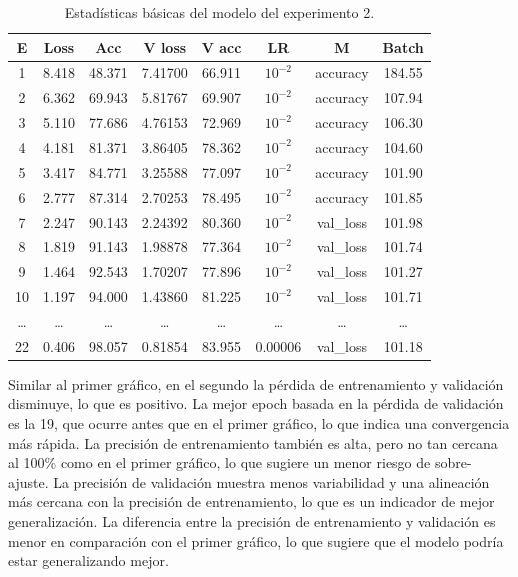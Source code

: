 \begin{table}[H]
    \small
    \begin{center}
        \begin{tabular}{|c|c|c|c|c|c|c|c|} \hline
        E & Loss & Acc & V loss & V acc & LR & M & Batch \\ \hline
        1 & 8.418 & 48.371 & 7.41700 & 66.911 & $10^{-2}$ & accuracy & 184.55 \\ \hline
        2 & 6.362 & 69.943 & 5.81767 & 69.907 & $10^{-2}$ & accuracy & 107.94 \\ \hline
        3 & 5.110 & 77.686 & 4.76153 & 72.969 & $10^{-2}$ & accuracy & 106.30 \\ \hline
        4 & 4.181 & 81.371 & 3.86405 & 78.362 & $10^{-2}$ & accuracy & 104.60 \\ \hline
        5 & 3.417 & 84.771 & 3.25588 & 77.097 & $10^{-2}$ & accuracy & 101.90 \\ \hline
        6 & 2.777 & 87.314 & 2.70253 & 78.495 & $10^{-2}$ & accuracy & 101.85 \\ \hline
        7 & 2.247 & 90.143 & 2.24392 & 80.360 & $10^{-2}$ & val\_loss & 101.98 \\ \hline
        8 & 1.819 & 91.143 & 1.98878 & 77.364 & $10^{-2}$ & val\_loss & 101.74 \\ \hline
        9 & 1.464 & 92.543 & 1.70207 & 77.896 & $10^{-2}$ & val\_loss & 101.27 \\ \hline
        10 & 1.197 & 94.000 & 1.43860 & 81.225 & $10^{-2}$ & val\_loss & 101.71 \\ \hline
        \dots & \dots & \dots & \dots & \dots & \dots & \dots & \dots \\ \hline
        22 & 0.406 & 98.057 & 0.81854 & 83.955 & 0.00006 & val\_loss & 101.18 \\ \hline
        \end{tabular}
        \caption{Estadísticas básicas del modelo del experimento 2.}
    \end{center}\label{fig:estadisticas_p2}
\end{table}

Similar al primer gráfico, en el segundo la pérdida de entrenamiento y validación disminuye, lo que es positivo. La mejor epoch basada en la pérdida de validación es la 19, que ocurre antes que en el primer gráfico, lo que indica una convergencia más rápida. La precisión de entrenamiento también es alta, pero no tan cercana al 100\% como en el primer gráfico, lo que sugiere un menor riesgo de sobre-ajuste. La precisión de validación muestra menos variabilidad y una alineación más cercana con la precisión de entrenamiento, lo que es un indicador de mejor generalización. La diferencia entre la precisión de entrenamiento y validación es menor en comparación con el primer gráfico, lo que sugiere que el modelo podría estar generalizando mejor.

